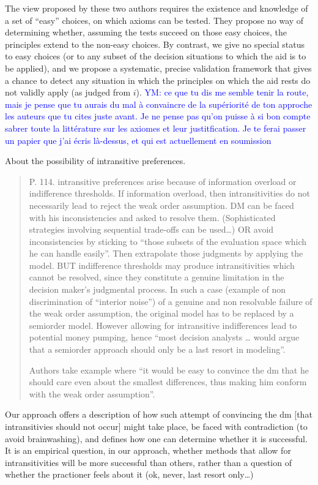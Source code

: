 \documentclass[preprint, french, english, 11pt, authoryear]{elsarticle}%
\newcommand{\commentYM}[1]{\textcolor{blue}{YM: #1}}
\begin{document}
The view proposed by these two authors requires the existence and knowledge of a set of “easy” choices, on which axioms can be tested. They propose no way of determining whether, assuming the tests succeed on those easy choices, the principles extend to the non-easy choices. By contrast, we give no special status to easy choices (or to any subset of the decision situations to which the aid is to be applied), and we propose a systematic, precise validation framework that gives a chance to detect any situation in which the principles on which the aid rests do not validly apply (as judged from $i$).
\commentYM{ce que tu dis me semble tenir la route, mais je pense que tu aurais du mal à convaincre de la supériorité de ton approche les auteurs que tu cites juste avant. Je ne pense pas qu'on puisse à si bon compte sabrer toute la littérature sur les axiomes et leur justitfication. Je te ferai passer un papier que j'ai écris là-dessus, et qui est actuellement en soumission}

About the possibility of intransitive preferences.
\begin{quote}
P. 114. intransitive preferences arise because of information overload or indifference thresholds. If information overload, then intransitivities do not necessarily lead to reject the weak order assumption. DM can be faced with his inconsistencies and asked to resolve them. (Sophisticated strategies involving sequential trade-offs can be used…) OR avoid inconsistencies by sticking to “those subsets of the evaluation space which he can handle easily”. Then extrapolate those judgments by applying the model. BUT indifference thresholds may produce intransitivities which cannot be resolved, since they constitute a genuine limitation in the decision maker’s judgmental process. In such a case (example of non discrimination of “interior noise”) of a genuine and non resolvable failure of the weak order assumption, the original model has to be replaced by a semiorder model. However allowing for intransitive indifferences lead to potential money pumping, hence “most decision analysts … would argue that a semiorder approach should only be a last resort in modeling”.

Authors take example where “it would be easy to convince the dm that he should care even about the smallest differences, thus making him conform with the weak order assumption”.
\end{quote}

Our approach offers a description of how such attempt of convincing the dm [that intransitivies should not occur] might take place, be faced with contradiction (to avoid brainwashing), and defines how one can determine whether it is successful. It is an empirical question, in our approach, whether methods that allow for intransitivities will be more successful than others, rather than a question of whether the practioner feels about it (ok, never, last resort only…)
\end{document}
